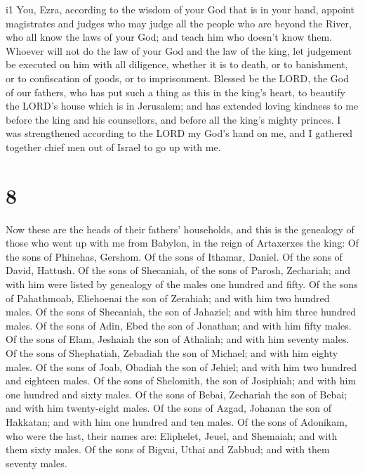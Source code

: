 i1 You, Ezra, according to the wisdom of your God that is
in your hand, appoint magistrates and judges who may judge all the
people who are beyond the River, who all know the laws of your God; and
teach him who doesn't know them.  Whoever will not do the
law of your God and the law of the king, let judgement be executed on
him with all diligence, whether it is to death, or to banishment, or to
confiscation of goods, or to imprisonment.  Blessed be the
LORD, the God of our fathers, who has put such a thing as this in the
king's heart, to beautify the LORD's house which is in Jerusalem;
 and has extended loving kindness to me before the king and
his counsellors, and before all the king's mighty princes. I was
strengthened according to the LORD my God's hand on me, and I gathered
together chief men out of Israel to go up with me.

\hypertarget{section-7}{%
\section{8}\label{section-7}}

 Now these are the heads of their fathers' households, and
this is the genealogy of those who went up with me from Babylon, in the
reign of Artaxerxes the king:  Of the sons of Phinehas,
Gershom. Of the sons of Ithamar, Daniel. Of the sons of David, Hattush.
 Of the sons of Shecaniah, of the sons of Parosh, Zechariah;
and with him were listed by genealogy of the males one hundred and
fifty.  Of the sons of Pahathmoab, Eliehoenai the son of
Zerahiah; and with him two hundred males.  Of the sons of
Shecaniah, the son of Jahaziel; and with him three hundred males.
 Of the sons of Adin, Ebed the son of Jonathan; and with him
fifty males.  Of the sons of Elam, Jeshaiah the son of
Athaliah; and with him seventy males.  Of the sons of
Shephatiah, Zebadiah the son of Michael; and with him eighty males.
 Of the sons of Joab, Obadiah the son of Jehiel; and with
him two hundred and eighteen males.  Of the sons of
Shelomith, the son of Josiphiah; and with him one hundred and sixty
males.  Of the sons of Bebai, Zechariah the son of Bebai;
and with him twenty-eight males.  Of the sons of Azgad,
Johanan the son of Hakkatan; and with him one hundred and ten males.
 Of the sons of Adonikam, who were the last, their names
are: Eliphelet, Jeuel, and Shemaiah; and with them sixty males.
 Of the sons of Bigvai, Uthai and Zabbud; and with them
seventy males.

